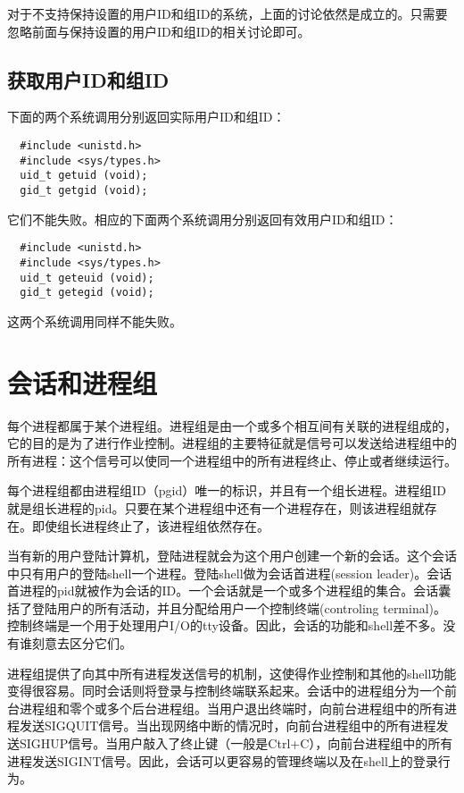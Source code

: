 对于不支持保持设置的用户ID和组ID的系统，上面的讨论依然是成立的。只需要忽略前面与保持设置的用户ID和组ID的相关讨论即可。

\subsection{获取用户ID和组ID}

下面的两个系统调用分别返回实际用户ID和组ID：

\begin{lstlisting}
  #include <unistd.h>
  #include <sys/types.h>
  uid_t getuid (void);
  gid_t getgid (void);
\end{lstlisting}

它们不能失败。相应的下面两个系统调用分别返回有效用户ID和组ID：

\begin{lstlisting}
  #include <unistd.h>
  #include <sys/types.h>
  uid_t geteuid (void);
  gid_t getegid (void);
\end{lstlisting}

这两个系统调用同样不能失败。

\section{会话和进程组}

每个进程都属于某个进程组。进程组是由一个或多个相互间有关联的进程组成的，它的目的是为了进行作业控制。进程组的主要特征就是信号可以发送给进程组中的所有进程：这个信号可以使同一个进程组中的所有进程终止、停止或者继续运行。

每个进程组都由进程组ID（pgid）唯一的标识，并且有一个组长进程。进程组ID就是组长进程的pid。只要在某个进程组中还有一个进程存在，则该进程组就存在。即使组长进程终止了，该进程组依然存在。

当有新的用户登陆计算机，登陆进程就会为这个用户创建一个新的会话。这个会话中只有用户的登陆shell一个进程。登陆shell做为会话首进程(session leader)。会话首进程的pid就被作为会话的ID。一个会话就是一个或多个进程组的集合。会话囊括了登陆用户的所有活动，并且分配给用户一个控制终端(controling terminal)。控制终端是一个用于处理用户I/O的tty设备。因此，会话的功能和shell差不多。没有谁刻意去区分它们。

进程组提供了向其中所有进程发送信号的机制，这使得作业控制和其他的shell功能变得很容易。同时会话则将登录与控制终端联系起来。会话中的进程组分为一个前台进程组和零个或多个后台进程组。当用户退出终端时，向前台进程组中的所有进程发送SIGQUIT信号。当出现网络中断的情况时，向前台进程组中的所有进程发送SIGHUP信号。当用户敲入了终止键（一般是Ctrl+C），向前台进程组中的所有进程发送SIGINT信号。因此，会话可以更容易的管理终端以及在shell上的登录行为。

